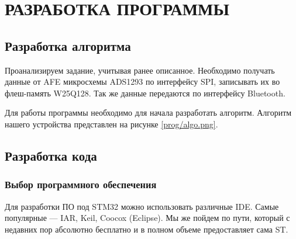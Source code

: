 \begin{sloppypar} %
\newpage %
\section{РАЗРАБОТКА ПРОГРАММЫ} %
\subsection{Разработка алгоритма}

Проанализируем задание, учитывая ранее описанное. Необходимо получать данные от \ac{AFE} микросхемы ADS1293 по интерфейсу SPI, записывать их во флеш-память W25Q128. Так же данные передаются по интерфейсу Bluetooth.


Для работы программы необходимо для начала разработать алгоритм. Алгоритм нашего устройства представлен на рисунке \ref{prog/algo.png}.










\subsection{Разработка кода}

\subsubsection{Выбор программного обеспечения}
Для разработки ПО под STM32 можно использовать различные IDE. Самые популярные — IAR, Keil, Coocox (Eclipse). Мы же пойдем по пути, который с недавних пор абсолютно бесплатно и в полном объеме предоставляет сама ST.



\end{sloppypar}
